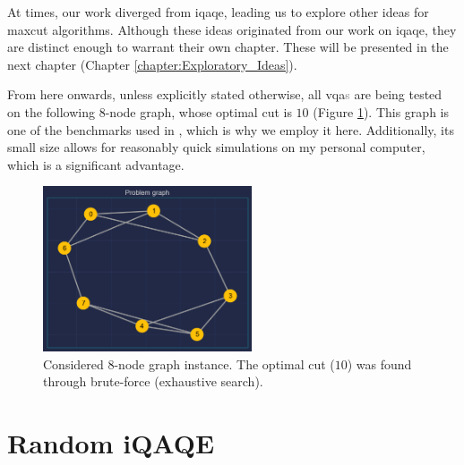 At times, our work diverged from \acrshort{iqaqe}, leading us to explore other ideas for \acrshort{maxcut} algorithms. Although these ideas originated from our work on \acrshort{iqaqe}, they are distinct enough to warrant their own chapter. These will be presented in the next chapter (Chapter \ref{chapter:Exploratory_Ideas}).

From here onwards, unless explicitly stated otherwise, all \acrshort{vqa}\textcolor{gray}{s} are being tested on the following $8$-node graph, whose optimal cut is $10$ (Figure \ref{fig:8_node_graph}). This graph is one of the benchmarks used in \cite{tenecohen2023variational}, which is why we employ it here. Additionally, its small size allows for reasonably quick simulations on my personal computer, which is a significant advantage.

\begin{figure}[H]
    \centering
    \includegraphics[width=0.55\textwidth]{Figures/Chapter_5/problem_graph.png}
    \caption{Considered $8$-node graph instance. The optimal cut ($10$) was found through
    brute-force (exhaustive search).}
    \label{fig:8_node_graph}
\end{figure}

\section{Random iQAQE}
\label{section:Base_iQAQE}


